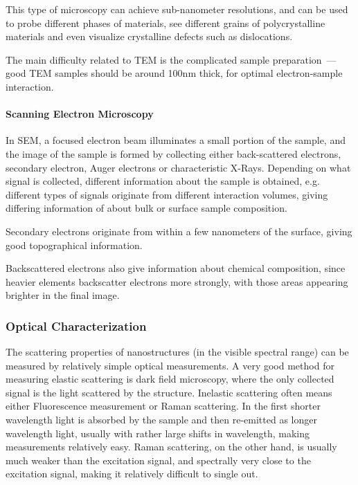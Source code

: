                     This type of microscopy can achieve sub-nanometer resolutions, and can be used to probe different phases of materials,
                see different grains of polycrystalline materials and even visualize crystalline defects such as dislocations.

                    The main difficulty related to TEM is the complicated sample preparation~--- good TEM samples should be around 100nm thick,
                for optimal electron-sample interaction.

            \paragraph{Scanning Electron Microscopy}
                    In SEM, a focused electron beam illuminates a small portion of the sample, and the image of the sample is formed by
                collecting either back-scattered electrons, secondary electron, Auger electrons or characteristic X-Rays. Depending on what
                signal is collected, different information about the sample is obtained, e.g. different types of signals originate from
                different interaction volumes, giving differing information of about bulk or surface sample composition.

                    Secondary electrons originate from within a few nanometers of the surface, giving good topographical information.

                    Backscattered electrons also give information about chemical composition, since heavier elements backscatter electrons
                more strongly, with those areas appearing brighter in the final image.

        \subsubsection{Optical Characterization}
        \label{sec:OpticalCharacterization}

                The scattering properties of nanostructures (in the visible spectral range) can be measured by relatively simple optical
            measurements. A very good method for measuring elastic scattering is dark field microscopy, where the only collected signal
            is the light scattered by the structure. Inelastic scattering often means either Fluorescence measurement or Raman scattering.
            In the first shorter wavelength light is absorbed by the sample and then re-emitted as longer wavelength light, usually with
            rather large shifts in wavelength, making measurements relatively easy. Raman scattering, on the other hand, is usually much weaker
            than the excitation signal, and spectrally very close to the excitation signal, making it relatively difficult to single out.

